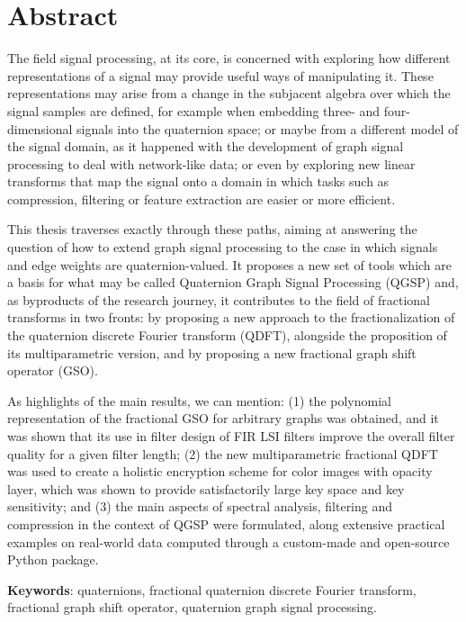 
%
\chapter*{Abstract}
\label{sec:abstract}

The field signal processing, at its core, is concerned with exploring how different representations of a signal may provide useful ways of manipulating it. These representations may arise from a change in the subjacent algebra over which the signal samples are defined, for example when embedding three- and four-dimensional signals into the quaternion space; or maybe from a different model of the signal domain, as it happened with the development of graph signal processing to deal with network-like data; or even by exploring new linear transforms that map the signal onto a domain in which tasks such as compression, filtering or feature extraction are easier or more efficient.

This thesis traverses exactly through these paths, aiming at answering the question of how to extend graph signal processing to the case in which signals and edge weights are quaternion-valued. It proposes a new set of tools which are a basis for what may be called Quaternion Graph Signal Processing (QGSP) and, as byproducts of the research journey, it contributes to the field of fractional transforms in two fronts: by proposing a new approach to the fractionalization of the quaternion discrete Fourier transform (QDFT), alongside the proposition of its multiparametric version, and by proposing a new fractional graph shift operator (GSO).

As highlights of the main results, we can mention: (1) the polynomial representation of the fractional GSO for arbitrary graphs was obtained, and it was shown that its use in filter design of FIR LSI filters improve the overall filter quality for a given filter length; (2) the new multiparametric fractional QDFT was used to create a holistic encryption scheme for color images with opacity layer, which was shown to provide satisfactorily large key space and key sensitivity; and (3) the main aspects of spectral analysis, filtering and compression in the context of QGSP were formulated, along extensive practical examples on real-world data computed through a custom-made and open-source Python package.
\vspace{1em}

\noindent
\textbf{Keywords}: quaternions, fractional quaternion discrete Fourier transform, fractional graph shift operator, quaternion graph signal processing.
